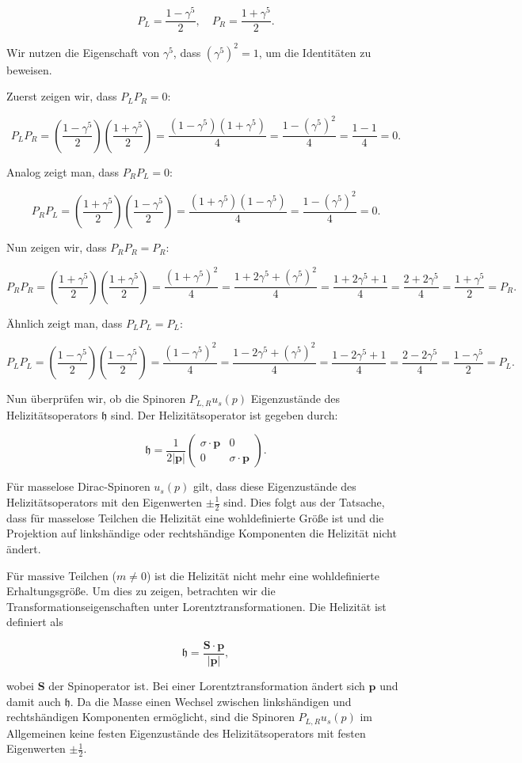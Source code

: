 \documentclass[11pt,a4paper]{article}
\begin{document}
\[
P_L = \frac{1 - \gamma^5}{2}, \quad P_R = \frac{1 + \gamma^5}{2}.
\]

Wir nutzen die Eigenschaft von \(\gamma^5\), dass \((\gamma^5)^2 = 1\), um die Identitäten zu beweisen.

Zuerst zeigen wir, dass \(P_L P_R = 0\):

\[
P_L P_R = \left(\frac{1 - \gamma^5}{2}\right)\left(\frac{1 + \gamma^5}{2}\right) = \frac{(1 - \gamma^5)(1 + \gamma^5)}{4} = \frac{1 - (\gamma^5)^2}{4} = \frac{1 - 1}{4} = 0.
\]

Analog zeigt man, dass \(P_R P_L = 0\):

\[
P_R P_L = \left(\frac{1 + \gamma^5}{2}\right)\left(\frac{1 - \gamma^5}{2}\right) = \frac{(1 + \gamma^5)(1 - \gamma^5)}{4} = \frac{1 - (\gamma^5)^2}{4} = 0.
\]

Nun zeigen wir, dass \(P_R P_R = P_R\):

\[
P_R P_R = \left(\frac{1 + \gamma^5}{2}\right)\left(\frac{1 + \gamma^5}{2}\right) = \frac{(1 + \gamma^5)^2}{4} = \frac{1 + 2\gamma^5 + (\gamma^5)^2}{4} = \frac{1 + 2\gamma^5 + 1}{4} = \frac{2 + 2\gamma^5}{4} = \frac{1 + \gamma^5}{2} = P_R.
\]

Ähnlich zeigt man, dass \(P_L P_L = P_L\):

\[
P_L P_L = \left(\frac{1 - \gamma^5}{2}\right)\left(\frac{1 - \gamma^5}{2}\right) = \frac{(1 - \gamma^5)^2}{4} = \frac{1 - 2\gamma^5 + (\gamma^5)^2}{4} = \frac{1 - 2\gamma^5 + 1}{4} = \frac{2 - 2\gamma^5}{4} = \frac{1 - \gamma^5}{2} = P_L.
\]

Nun überprüfen wir, ob die Spinoren \(P_{L, R} u_s(p)\) Eigenzustände des Helizitätsoperators \(\mathfrak{h}\) sind. Der Helizitätsoperator ist gegeben durch:

\[
\mathfrak{h} = \frac{1}{2|\mathbf{p}|}\left(\begin{array}{cc}
\sigma \cdot \mathbf{p} & 0 \\
0 & \sigma \cdot \mathbf{p}
\end{array}\right).
\]

Für masselose Dirac-Spinoren \(u_s(p)\) gilt, dass diese Eigenzustände des Helizitätsoperators mit den Eigenwerten \(\pm \frac{1}{2}\) sind. Dies folgt aus der Tatsache, dass für masselose Teilchen die Helizität eine wohldefinierte Größe ist und die Projektion auf linkshändige oder rechtshändige Komponenten die Helizität nicht ändert.

Für massive Teilchen (\(m \neq 0\)) ist die Helizität nicht mehr eine wohldefinierte Erhaltungsgröße. Um dies zu zeigen, betrachten wir die Transformationseigenschaften unter Lorentztransformationen. Die Helizität ist definiert als

\[
\mathfrak{h} = \frac{\mathbf{S} \cdot \mathbf{p}}{|\mathbf{p}|},
\]

wobei \(\mathbf{S}\) der Spinoperator ist. Bei einer Lorentztransformation ändert sich \(\mathbf{p}\) und damit auch \(\mathfrak{h}\). Da die Masse einen Wechsel zwischen linkshändigen und rechtshändigen Komponenten ermöglicht, sind die Spinoren \(P_{L, R} u_s(p)\) im Allgemeinen keine festen Eigenzustände des Helizitätsoperators mit festen Eigenwerten \(\pm \frac{1}{2}\).

\end{document}
